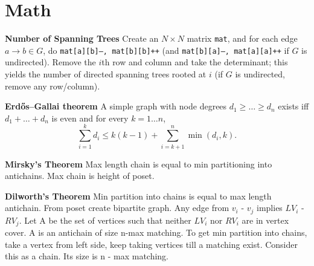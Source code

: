 \section{Math}
\textbf{Number of Spanning Trees}
Create an $N\times N$ matrix \texttt{mat}, and for each edge $a \rightarrow b \in G$, do
\texttt{mat[a][b]--, mat[b][b]++} (and \texttt{mat[b][a]--, mat[a][a]++} if $G$ is undirected).
Remove the $i$th row and column and take the determinant; this yields the number of directed spanning trees rooted at $i$
(if $G$ is undirected, remove any row/column).

\textbf{Erdős–Gallai theorem}
A simple graph with node degrees $d_1 \ge \dots \ge d_n$ exists iff $d_1 + \dots + d_n$ is even and for every $k = 1\dots n$,
\[ \sum _{i=1}^{k}d_{i}\leq k(k-1)+\sum _{i=k+1}^{n}\min(d_{i},k). \]

\textbf{Mirsky's Theorem} Max length chain is equal to min partitioning into antichains. Max chain is height of poset.

\textbf{Dilworth's Theorem} Min partition into chains is equal to max length antichain. From poset create bipartite graph. Any edge from $v_{i}$ - $v_{j}$ implies  $LV_{i}$ - $RV_{j}$. Let A be the set of vertices such that neither $LV_{i}$ nor $RV_{i}$ are in vertex cover. A is an antichain of size n-max matching. To get min partition into chains, take a vertex from left side, keep taking vertices till a matching exist. Consider this as a chain. Its size is n - max matching.



